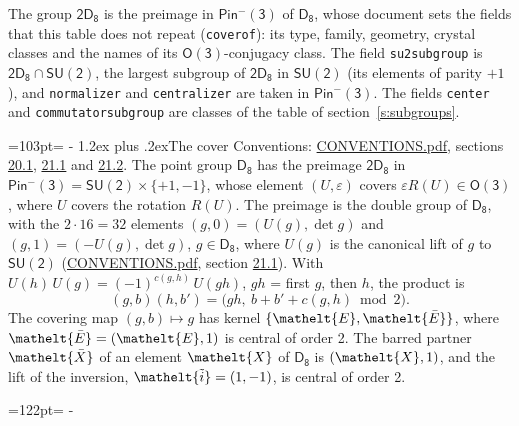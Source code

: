 \documentclass[10pt,a4paper]{article}
\makeatletter
\renewcommand\section{\@startsection{section}{1}{\z@}{-3ex plus -1ex minus -.2ex}%
  {1.2ex plus .2ex}{\normalfont\large\sffamily\bfseries\color{parttitle}}}
\newcommand{\needspace}[1]{\par\penalty-100\begingroup\dimen0=#1\relax\dimen2=\pagegoal
  \advance\dimen2-\pagetotal\ifdim\dimen0>\dimen2\relax\ifdim\dimen2>0pt\vfil\break\fi\fi
  \endgroup}
\numberwithin{equation}{section}
\newcommand{\eltfont}[1]{{\let\sigma\eltsigma\mathelt{#1}}}
\newcommand{\grp}[1]{\mathsf{#1}}
\newcommand{\elt}[1]{\eltfont{#1}}
\newcommand{\dirprod}{\times}
\newcommand{\barred}[1]{\bar{#1}}
\newcommand{\lift}[1]{\tilde{#1}}
\makeatother
\begin{document}
\leavevmode\label{n:element.inversion}\label{n:group.preimage}The group $\grp{2D_{8}}$ is the preimage in $\grp{Pin^{-}(3)}$ of \href{../../../rotation/data/pdf/D8.pdf}{$\grp{D_{8}}$}, whose document sets the fields that this table does not repeat (\texttt{coverof}): its type, family, geometry, crystal classes and the names of its \href{../../../rotation/data/pdf/O3.pdf}{$\grp{O(3)}$}-conjugacy class. The field \texttt{su2subgroup} is $\grp{2D_{8}} \cap \grp{SU(2)}$, the largest subgroup of $\grp{2D_{8}}$ in $\grp{SU(2)}$ (its elements of parity $+1$), and \texttt{normalizer} and \texttt{centralizer} are taken in $\grp{Pin^{-}(3)}$. The fields \texttt{center} and \texttt{commutatorsubgroup} are classes of the table of section~\ref{s:subgroups}.
\needspace{103pt}
\section{The cover}\label{s:cover}
Conventions: \href{../../CONVENTIONS.pdf}{CONVENTIONS.pdf}, sections \href{../../CONVENTIONS.pdf\#conv.20.1}{20.1}, \href{../../CONVENTIONS.pdf\#conv.21.1}{21.1} and \href{../../CONVENTIONS.pdf\#conv.21.2}{21.2}.
\leavevmode\label{n:group.pin.minus}\label{n:group.su2}\label{n:local.pin.sign}\label{n:matrix.covered}\label{n:matrix.lift.su2}\label{n:index.bar}The point group $\grp{D_{8}}$ has the preimage $\grp{2D_{8}}$ in $\grp{Pin^{-}(3)} = \grp{SU(2)} \dirprod \{+1, -1\}$, whose element $(U, \varepsilon)$ covers $\varepsilon R(U) \in \grp{O(3)}$, where $U$ covers the rotation $R(U)$. The preimage is the double group of $\grp{D_{8}}$, with the $2 \cdot 16 = 32$ elements $(g, 0) = (U(g), \det g)$ and $(g, 1) = (-U(g), \det g)$, $g \in \grp{D_{8}}$, where $U(g)$ is the canonical lift of $g$ to $\grp{SU(2)}$ (\href{../../CONVENTIONS.pdf}{CONVENTIONS.pdf}, section \href{../../CONVENTIONS.pdf\#conv.21.1}{21.1}). \label{n:function.cocycle}With $U(h)\,U(g) = (-1)^{c(g,h)}\,U(gh)$, $gh$ = first $g$, then $h$, the product is
\begin{equation}\label{e:product}(g, b)(h, b') = \bigl(gh,\ b + b' + c(g, h) \bmod 2\bigr).\end{equation}
\leavevmode\label{n:mark.bar}The covering map $(g, b) \mapsto g$ has kernel $\{\elt{E}, \elt{\barred{E}}\}$, where $\elt{\barred{E}} = (\elt{E}, 1)$ is central of order 2. \label{n:element.named}\label{n:mark.lift}The barred partner $\elt{\barred{X}}$ of an element $\elt{X}$ of $\grp{D_{8}}$ is $(\elt{X}, 1)$, and the lift of the inversion, $\elt{\lift{i}} = (1, -1)$, is central of order 2.
\needspace{122pt}
\end{document}
